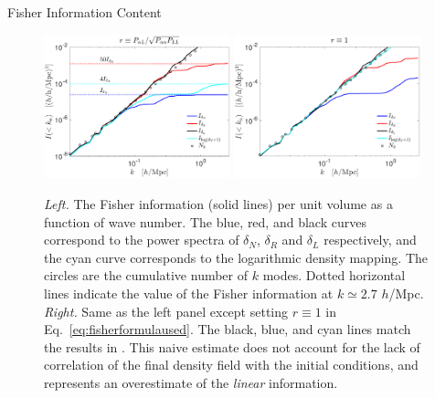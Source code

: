 \begin{section}{Fisher Information Content}
  \begin{figure}
    \includegraphics[width=0.48\textwidth]{fig4a.pdf}
    \includegraphics[width=0.48\textwidth]{fig4b.pdf}
    \centering
    \caption{{\it Left.} The Fisher information (solid lines) per unit volume as
      a function of wave number.  The blue, red, and black curves correspond to the power spectra
      of $\delta_N$, $\delta_R$ and $\delta_L$ respectively,
      and the cyan curve
      corresponds to the logarithmic density mapping. The circles
      are the cumulative number of $k$ modes.  Dotted horizontal lines indicate the value of the 
      Fisher information at $k \simeq 2.7$ $h$/Mpc.  {\it Right.} Same
      as the left panel except setting $r\equiv 1$ in Eq.~\ref{eq:fisherformulaused}. The
      black, blue, and cyan lines match the results in \cite{bib:Rimes2006,bib:Mark2009}. 
This naive estimate does not account for the lack of correlation
of the final density field with the initial conditions, and represents
an overestimate of the {\it linear} information.}
  \label{fig:fisherinfo}
\end{figure}
\end{section}

